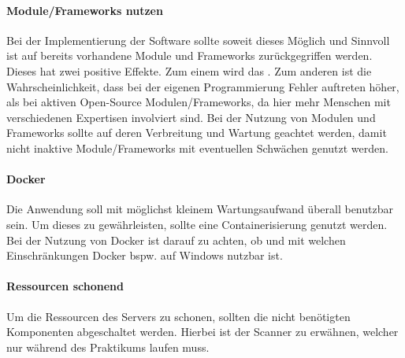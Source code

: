 \paragraph{Module/Frameworks nutzen}
Bei der Implementierung der Software sollte soweit dieses Möglich und Sinnvoll ist auf bereits vorhandene Module und Frameworks zurückgegriffen werden. Dieses hat zwei positive Effekte. Zum einem wird das . Zum anderen ist die Wahrscheinlichkeit, dass bei der eigenen Programmierung Fehler auftreten höher, als bei aktiven Open-Source Modulen/Frameworks, da hier mehr Menschen mit verschiedenen Expertisen involviert sind. Bei der Nutzung von Modulen und Frameworks sollte auf deren Verbreitung und Wartung geachtet werden, damit nicht inaktive Module/Frameworks mit eventuellen Schwächen genutzt werden.

\paragraph{Docker}
Die Anwendung soll mit möglichst kleinem Wartungsaufwand überall benutzbar sein. Um dieses zu gewährleisten, sollte eine Containerisierung genutzt werden. Bei der Nutzung von Docker ist darauf zu achten, ob und mit welchen Einschränkungen Docker bspw. auf Windows nutzbar ist.

\paragraph{Ressourcen schonend}
Um die Ressourcen des Servers zu schonen, sollten die nicht benötigten Komponenten abgeschaltet werden. Hierbei ist der Scanner zu erwähnen, welcher nur während des Praktikums laufen muss. 